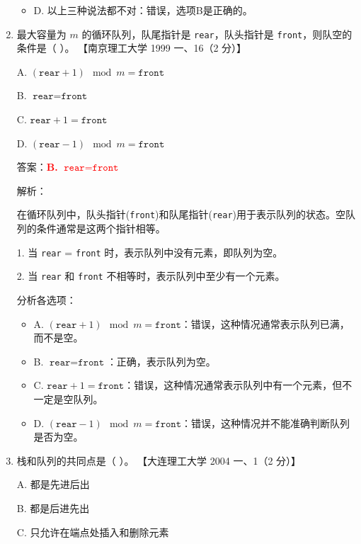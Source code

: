 \documentclass[lang=cn,newtx,10pt,scheme=chinese]{../../../elegantbook}
\begin{document}
\begin{enumerate}
\begin{itemize}
        \item D. 以上三种说法都不对：错误，选项B是正确的。
    \end{itemize}

    \item 最大容量为 $m$ 的循环队列，队尾指针是 \texttt{rear}，队头指针是 \texttt{front}，则队空的条件是（ ）。  
    【南京理工大学 1999 一、16（2 分）】  

    A. $(\texttt{rear} + 1) \mod m = \texttt{front}$  

    B. $\texttt{rear} = \texttt{front}$  

    C. $\texttt{rear} + 1 = \texttt{front}$  

    D. $(\texttt{rear} - 1) \mod m = \texttt{front}$  

    答案：\textcolor{red}{\textbf{B.} $\texttt{rear} = \texttt{front}$}

    解析：

    在循环队列中，队头指针(\texttt{front})和队尾指针(\texttt{rear})用于表示队列的状态。空队列的条件通常是这两个指针相等。

    1. 当 \texttt{rear} = \texttt{front} 时，表示队列中没有元素，即队列为空。

    2. 当 \texttt{rear} 和 \texttt{front} 不相等时，表示队列中至少有一个元素。

    分析各选项：
    \begin{itemize}
        \item A. $(\texttt{rear} + 1) \mod m = \texttt{front}$：错误，这种情况通常表示队列已满，而不是空。
        
        \item B. $\texttt{rear} = \texttt{front}$：正确，表示队列为空。
        
        \item C. $\texttt{rear} + 1 = \texttt{front}$：错误，这种情况通常表示队列中有一个元素，但不一定是空队列。
        
        \item D. $(\texttt{rear} - 1) \mod m = \texttt{front}$：错误，这种情况并不能准确判断队列是否为空。
    \end{itemize}

    \item 栈和队列的共同点是（ ）。  
    【大连理工大学 2004 一、1（2 分）】  

    A. 都是先进后出  

    B. 都是后进先出  

    C. 只允许在端点处插入和删除元素  


\end{enumerate}
\end{document}
